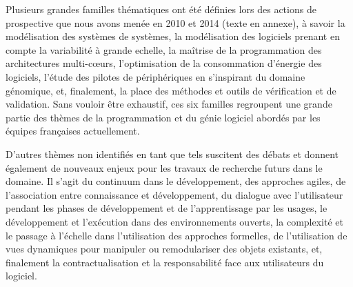 \documentclass[11pt]{article}
\newcommand{\mynote}[3][black]{\textcolor{#1}{\fbox{\bfseries\sffamily\scriptsize{#2}}
{\small$\blacktriangleright$\textsf{\emph{#3}}$\blacktriangleleft$}}}
\newcommand{\pem}[1]{} %
\begin{document}





Plusieurs grandes familles thématiques ont été définies lors des actions de
prospective que nous avons menée en 2010 et 2014 (texte en annexe), à savoir 
la modélisation des systèmes de systèmes, 
la modélisation des logiciels prenant en compte la variabilité à grande echelle,
la maîtrise de la programmation des architectures multi-c{\oe}urs,
l'optimisation de la consommation d'énergie des logiciels,
l'étude des pilotes de périphériques en s'inspirant du domaine génomique,
et, finalement, la place des méthodes et outils de vérification et de validation. 
%
Sans vouloir être exhaustif, ces six familles regroupent une grande partie des
thèmes de la programmation et du génie logiciel abordés par les équipes
françaises actuellement. 
%
\pem{mettre à jour ce paragraphe}
D'autres thèmes non identifiés en tant que tels suscitent des débats et donnent
également de nouveaux enjeux pour les travaux de recherche futurs dans le
domaine. Il s'agit du continuum dans le développement, des approches agiles, de
l'association entre connaissance et développement, du dialogue avec
l'utilisateur pendant les phases de développement et de l'apprentissage par les
usages, le développement et l'exécution dans des environnements ouverts, la
complexité et le passage à l'échelle dans l'utilisation des approches
formelles, de l'utilisation de vues dynamiques pour manipuler ou remodulariser
des  objets existants, et, finalement la contractualisation et la
responsabilité face aux utilisateurs du logiciel.
\end{document}
